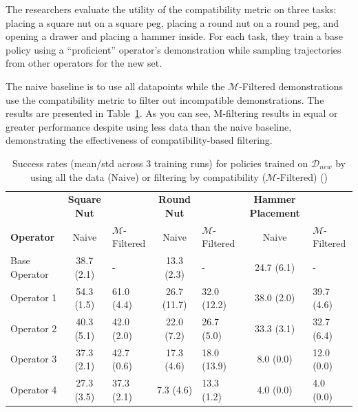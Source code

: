 \documentclass[
  letterpaper,
  numbers=noenddot,
  DIV=11]{scrreprt}
\theoremstyle{definition}
\theoremstyle{plain}
\theoremstyle{plain}
\theoremstyle{remark}
\begin{document}
The researchers evaluate the utility of the compatibility metric on
three tasks: placing a square nut on a square peg, placing a round nut
on a round peg, and opening a drawer and placing a hammer inside. For
each task, they train a base policy using a ``proficient'' operator's
demonstration while sampling trajectories from other operators for the
new set.

The naive baseline is to use all datapoints while the
\(\mathcal{M}\)-Filtered demonstrations use the compatibility metric to
filter out incompatible demonstrations. The results are presented in
Table~\ref{tbl-m_filter_table}. As you can see, M-filtering results in
equal or greater performance despite using less data than the naive
baseline, demonstrating the effectiveness of compatibility-based
filtering.

\begin{longtable}[]{@{}lclclcl@{}}
\caption{Success rates (mean/std across 3 training runs) for policies
trained on \(\mathcal{D}_{new}\) by using all the data (Naive) or
filtering by compatibility (\(\mathcal{M}\)-Filtered)
()}\label{tbl-m_filter_table}\tabularnewline
\toprule\noalign{}
\endfirsthead
\endhead
\bottomrule\noalign{}
\endlastfoot
& \textbf{Square Nut} & & \textbf{Round Nut} & & \textbf{Hammer
Placement} & \\
\textbf{Operator} & Naive & \(\mathcal{M}\)-Filtered & Naive &
\(\mathcal{M}\)-Filtered & Naive & \(\mathcal{M}\)-Filtered \\
Base Operator & 38.7 (2.1) & - & 13.3 (2.3) & - & 24.7 (6.1) & - \\
Operator 1 & 54.3 (1.5) & 61.0 (4.4) & 26.7 (11.7) & 32.0 (12.2) & 38.0
(2.0) & 39.7 (4.6) \\
Operator 2 & 40.3 (5.1) & 42.0 (2.0) & 22.0 (7.2) & 26.7 (5.0) & 33.3
(3.1) & 32.7 (6.4) \\
Operator 3 & 37.3 (2.1) & 42.7 (0.6) & 17.3 (4.6) & 18.0 (13.9) & 8.0
(0.0) & 12.0 (0.0) \\
Operator 4 & 27.3 (3.5) & 37.3 (2.1) & 7.3 (4.6) & 13.3 (1.2) & 4.0
(0.0) & 4.0 (0.0) \\
\end{longtable}
\end{document}

